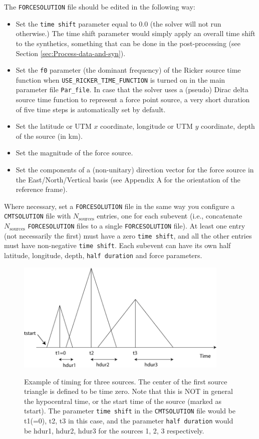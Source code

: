 \noindent The \texttt{FORCESOLUTION} file should be edited in the
following way:
\begin{itemize}
\item Set the \texttt{time shift} parameter equal to $0.0$ (the solver
will not run otherwise.) The time shift parameter would simply apply
an overall time shift to the synthetics, something that can be done
in the post-processing (see Section \ref{sec:Process-data-and-syn}).
\item Set the \texttt{f0} parameter (the dominant frequency) of the Ricker source time
function when {\texttt{USE\_RICKER\_TIME\_FUNCTION}} is turned on
in the main parameter file {\texttt{Par\_file}}. In case that the
solver uses a (pseudo) Dirac delta source time function to represent
a force point source, a very short duration of five time steps is automatically set by default.
\item Set the latitude or UTM $x$ coordinate, longitude or UTM $y$ coordinate, depth of the source (in km).
\item Set the magnitude of the force source.
\item Set the components of a (non-unitary) direction vector for the force
source in the East/North/Vertical basis (see Appendix A for the orientation
of the reference frame).
\end{itemize}
\noindent Where necessary, set a \texttt{FORCESOLUTION} file in the
same way you configure a \texttt{CMTSOLUTION} file with $N_{\mathrm{sources}}$
entries, one for each subevent (i.e., concatenate $N_{\mathrm{sources}}$
\texttt{FORCESOLUTION} files to a single \texttt{FORCESOLUTION} file).
At least one entry (not necessarily the first) must have a zero \texttt{time
shift}, and all the other entries must have non-negative \texttt{time
shift}. Each subevent can have its own half latitude, longitude, depth,
\texttt{half duration} and force parameters.

\begin{figure}[H]
\begin{centering}
\includegraphics[width=4in]{figures/source_timing.jpg}
\par
\end{centering}
\caption{Example of timing for three sources. The center of the first source
triangle is defined to be time zero. Note that this is NOT in general
the hypocentral time, or the start time of the source (marked as tstart).
The parameter \texttt{time shift} in the \texttt{CMTSOLUTION} file
would be t1(=0), t2, t3 in this case, and the parameter \texttt{half
duration} would be hdur1, hdur2, hdur3 for the sources 1, 2, 3 respectively.}
{\small \label{fig:source_timing} }
\end{figure}


